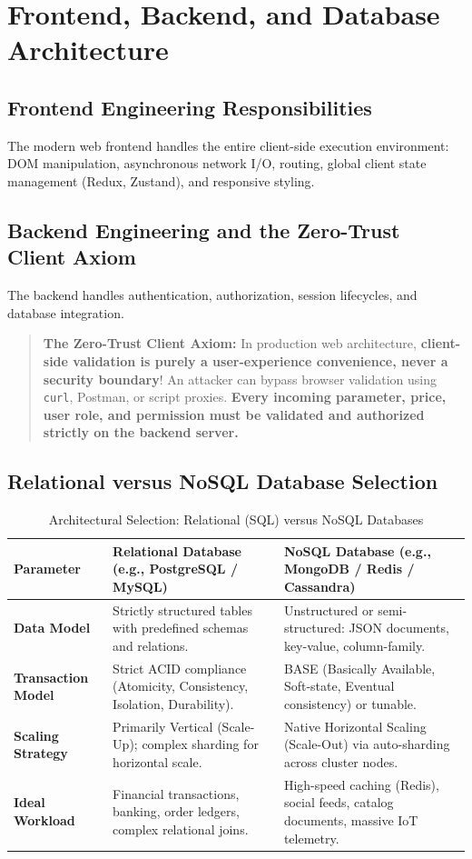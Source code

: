 \section{Frontend, Backend, and Database Architecture}
\label{sec:se_frontend_backend_db}

\subsection{Frontend Engineering Responsibilities}
The modern web frontend handles the entire client-side execution environment: DOM manipulation, asynchronous network I/O, routing, global client state management (Redux, Zustand), and responsive styling.

\subsection{Backend Engineering and the Zero-Trust Client Axiom}
The backend handles authentication, authorization, session lifecycles, and database integration.
\begin{quote}
\textbf{The Zero-Trust Client Axiom:} In production web architecture, \textbf{client-side validation is purely a user-experience convenience, never a security boundary}! An attacker can bypass browser validation using \texttt{curl}, Postman, or script proxies. \textbf{Every incoming parameter, price, user role, and permission must be validated and authorized strictly on the backend server.}
\end{quote}

\subsection{Relational versus NoSQL Database Selection}
\begin{table}[htbp]
\centering
\small
\caption{Architectural Selection: Relational (SQL) versus NoSQL Databases}
\label{tab:sql_vs_nosql_selection}
\begin{tabularx}{\textwidth}{l p{5cm} X}
\toprule
\textbf{Parameter} & \textbf{Relational Database (e.g., PostgreSQL / MySQL)} & \textbf{NoSQL Database (e.g., MongoDB / Redis / Cassandra)} \\
\midrule
\textbf{Data Model} & Strictly structured tables with predefined schemas and relations. & Unstructured or semi-structured: JSON documents, key-value, column-family. \\
\textbf{Transaction Model} & Strict ACID compliance (Atomicity, Consistency, Isolation, Durability). & BASE (Basically Available, Soft-state, Eventual consistency) or tunable. \\
\textbf{Scaling Strategy} & Primarily Vertical (Scale-Up); complex sharding for horizontal scale. & Native Horizontal Scaling (Scale-Out) via auto-sharding across cluster nodes. \\
\textbf{Ideal Workload} & Financial transactions, banking, order ledgers, complex relational joins. & High-speed caching (Redis), social feeds, catalog documents, massive IoT telemetry. \\
\bottomrule
\end{tabularx}
\end{table}


